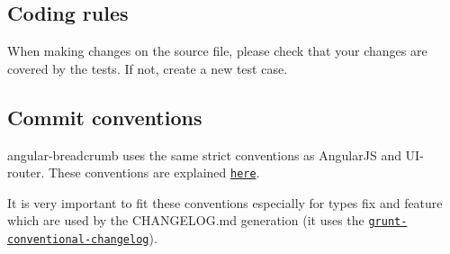 \subsection*{Coding rules}


\begin{DoxyItemize}
\item When making changes on the source file, please check that your changes are covered by the tests. If not, create a new test case.
\end{DoxyItemize}

\subsection*{Commit conventions}

angular-\/breadcrumb uses the same strict conventions as Angular\+JS and U\+I-\/router. These conventions are explained \href{https://github.com/angular/angular.js/blob/master/CONTRIBUTING.md#-git-commit-guidelines}{\tt here}.

It is very important to fit these conventions especially for types {\ttfamily fix} and {\ttfamily feature} which are used by the C\+H\+A\+N\+G\+E\+L\+O\+G.\+md generation (it uses the \href{https://github.com/btford/grunt-conventional-changelog}{\tt grunt-\/conventional-\/changelog}). 